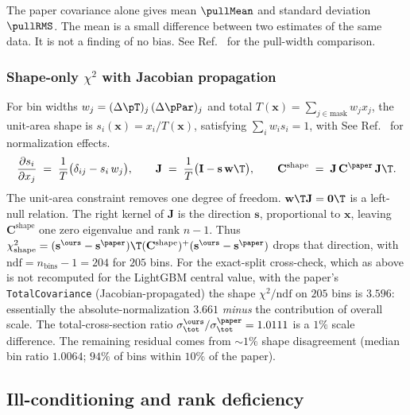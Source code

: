 The paper covariance alone gives mean $\pullMean$ and standard deviation $\pullRMS$. The mean is a small difference between two estimates of the same data. It is not a finding of no bias. See Ref.~\cite{NoteRecords2026} for the pull-width comparison.

\subsubsection{Shape-only $\chi^{2}$ with Jacobian propagation}
\label{sec:shape}

For bin widths $w_{j} = (\Delta\pT)_{j}\,(\Delta\pPar)_{j}$ and total $T(\mathbf{x}) = \sum_{j\in\text{mask}} w_{j}x_{j}$, the unit-area shape is $s_{i}(\mathbf{x}) = x_{i}/T(\mathbf{x})$, satisfying $\sum_{i} w_{i} s_{i} = 1$, with See Ref.~\cite{NoteRecords2026} for normalization effects.
\begin{equation}
\frac{\partial s_{i}}{\partial x_{j}}
\;=\;
\frac{1}{T}\big(\delta_{ij} - s_{i}\,w_{j}\big),
\qquad
\mathbf{J} \;=\; \frac{1}{T}\big(\mathbf{I} - \mathbf{s}\,\mathbf{w}\T\big),
\qquad
\mathbf{C}^{\text{shape}} \;=\; \mathbf{J}\,\mathbf{C}^{\paper}\,\mathbf{J}\T.
\end{equation}
The unit-area constraint removes one degree of freedom. $\mathbf{w}\T\mathbf{J} = \mathbf{0}\T$ is a left-null relation. The right kernel of $\mathbf{J}$ is the direction $\mathbf{s}$, proportional to $\mathbf{x}$, leaving $\mathbf{C}^{\text{shape}}$ one zero eigenvalue and rank $n-1$. Thus $\chi^{2}_{\text{shape}} = (\mathbf{s}^{\ours}-\mathbf{s}^{\paper})\T (\mathbf{C}^{\text{shape}})^{+} (\mathbf{s}^{\ours}-\mathbf{s}^{\paper})$ drops that direction, with $\mathrm{ndf} = n_{\text{bins}} - 1 = 204$ for $205$ bins. For the exact-split cross-check, which as above is not recomputed for the LightGBM central value, with the paper's \texttt{TotalCovariance} (Jacobian-propagated) the shape $\chi^{2}/\mathrm{ndf}$ on $205$ bins is $\boxed{3.596}$: essentially the absolute-normalization $3.661$ \emph{minus} the contribution of overall scale. The total-cross-section ratio $\sigma_{\tot}^{\ours}/\sigma_{\tot}^{\paper} = 1.0111$ is a $1\%$ scale difference. The remaining residual comes from $\sim 1\%$ shape disagreement (median bin ratio $1.0064$; $94\%$ of bins within $10\%$ of the paper).

\subsection{Ill-conditioning and rank deficiency}
\label{sec:rank}

